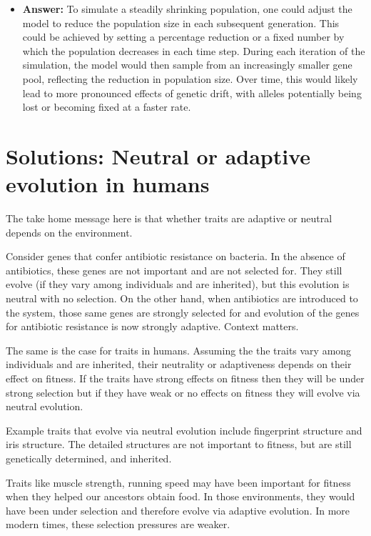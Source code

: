 \documentclass[
  a4paper]{book}
\providecommand{\tightlist}{%
  \setlength{\itemsep}{0pt}\setlength{\parskip}{0pt}}
\begin{document}
\begin{enumerate}
  \begin{itemize}
  \tightlist
  \item
    \textbf{Answer:} To simulate a steadily shrinking population, one could adjust the model to reduce the population size in each subsequent generation. This could be achieved by setting a percentage reduction or a fixed number by which the population decreases in each time step. During each iteration of the simulation, the model would then sample from an increasingly smaller gene pool, reflecting the reduction in population size. Over time, this would likely lead to more pronounced effects of genetic drift, with alleles potentially being lost or becoming fixed at a faster rate.
  \end{itemize}
\end{enumerate}

\section{Solutions: Neutral or adaptive evolution in humans}\label{solutions-neutral-or-adaptive-evolution-in-humans}

The take home message here is that whether traits are adaptive or neutral depends on the environment.

Consider genes that confer antibiotic resistance on bacteria. In the absence of antibiotics, these genes are not important and are not selected for. They still evolve (if they vary among individuals and are inherited), but this evolution is neutral with no selection. On the other hand, when antibiotics are introduced to the system, those same genes are strongly selected for and evolution of the genes for antibiotic resistance is now strongly adaptive. Context matters.

The same is the case for traits in humans. Assuming the the traits vary among individuals and are inherited, their neutrality or adaptiveness depends on their effect on fitness. If the traits have strong effects on fitness then they will be under strong selection but if they have weak or no effects on fitness they will evolve via neutral evolution.

Example traits that evolve via neutral evolution include fingerprint structure and iris structure. The detailed structures are not important to fitness, but are still genetically determined, and inherited.

Traits like muscle strength, running speed may have been important for fitness when they helped our ancestors obtain food. In those environments, they would have been under selection and therefore evolve via adaptive evolution. In more modern times, these selection pressures are weaker.
\end{document}
